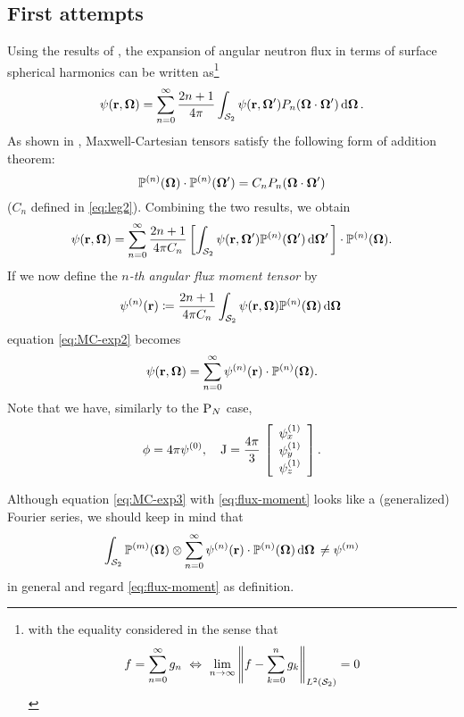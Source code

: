 \subsection{First attempts}
Using the results of , the expansion of angular neutron flux in terms of surface spherical 
harmonics can be written as\footnote{with the equality considered in the sense that $$f = \sum_{n=0}^{\infty}g_{n}\
\Leftrightarrow\ \lim_{n\to\infty} \left\Vert f - \sum_{k=0}^{n} g_{k} \right\Vert_{\Lp[2](\Sphere)} = 0$$}
\begin{equation}\label{eq:MC-exp1}
  \psi(\br,\bomega) = \suma[n]{0}{\infty}\frac{2n+1}{4\pi}\intA{\psi(\br,\bomega')P_n(\bomega\cdot\bomega')}.
\end{equation}
As shown in \cite[Sec. 7, Corollary II]{Applequist1}, Maxwell-Cartesian tensors
satisfy the following form of addition theorem:
\begin{equation}\label{eq:MC-addition}
  \PP(\bomega)\contr\PP(\bomega') = C_n P_n(\bomega\cdot\bomega')
\end{equation}
($C_n$ defined in \eqref{eq:leg2}). Combining the two results, we obtain
\begin{equation}\label{eq:MC-exp2}
  \psi(\br,\bomega) = \suma[n]{0}{\infty}\frac{2n+1}{4\pi
  C_n}\left[\intA[']{\psi(\br,\bomega')\PP(\bomega')}\right]\contr\PP(\bomega).
\end{equation}
If we now define the \textit{$n$-th angular flux moment tensor} by
\begin{equation}\label{eq:flux-moment}
  \fmom(\br) \coloneqq \frac{2n+1}{4\pi C_n}\intA{\psi(\br,\bomega)\PP(\bomega)}
\end{equation}
equation \eqref{eq:MC-exp2} becomes
\begin{equation}\label{eq:MC-exp3}
  \psi(\br,\bomega) = \suma[n]{0}{\infty}\fmom(\br)\contr\PP(\bomega).
\end{equation}
Note that we have, similarly to the $\PN$ case, 
$$
	\phi = 4\pi\fmom[0],\quad \bJ = \frac{4\pi }{3}\, \left[\begin{array}{c}\fmom[1]_x\\
	\fmom[1]_y\\ \fmom[1]_z\end{array}\right].
$$

Although equation \eqref{eq:MC-exp3} with \eqref{eq:flux-moment} looks like a (generalized) Fourier series, we should 
keep in mind that
$$
  \intA{\PP[m](\bomega)\otimes\suma[n]{0}{\infty}\fmom(\br)\contr\PP(\bomega)} \neq \fmom[m]
$$
in general and regard \eqref{eq:flux-moment} as definition.

